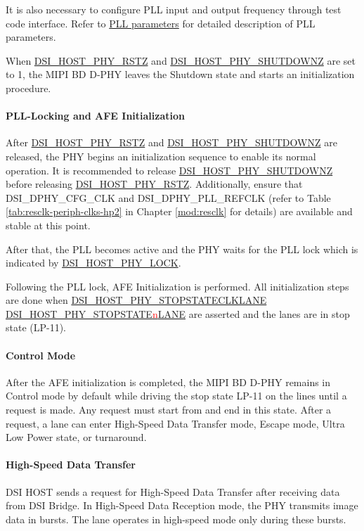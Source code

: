 \documentclass[main\_\_EN.tex]{subfiles}
\begin{document}
It is also necessary to configure PLL input and output frequency through test code interface. Refer to \hyperref[sec:pll-parameters]{PLL parameters} for detailed description of PLL parameters.

When \hyperref[fielddesc:DSIHOSTPHYRSTZ]{DSI\_HOST\_PHY\_RSTZ} and \hyperref[fielddesc:DSIHOSTPHYSHUTDOWNZ]{DSI\_HOST\_PHY\_SHUTDOWNZ} are set to 1, the MIPI BD D-PHY leaves the Shutdown state and starts an initialization procedure.

\paragraph{PLL-Locking and AFE Initialization}
After \hyperref[fielddesc:DSIHOSTPHYRSTZ]{DSI\_HOST\_PHY\_RSTZ} and \hyperref[fielddesc:DSIHOSTPHYSHUTDOWNZ]{DSI\_HOST\_PHY\_SHUTDOWNZ} are released, the PHY begins an initialization sequence to enable its normal operation. It is recommended to release \hyperref[fielddesc:DSIHOSTPHYSHUTDOWNZ]{DSI\_HOST\_PHY\_SHUTDOWNZ} before releasing \hyperref[fielddesc:DSIHOSTPHYRSTZ]{DSI\_HOST\_PHY\_RSTZ}. Additionally, ensure that DSI\_DPHY\_CFG\_CLK and DSI\_DPHY\_PLL\_REFCLK (refer to Table \ref{tab:resclk-periph-clks-hp2} in Chapter \ref{mod:resclk} \textit{} for details) are available and stable at this point.

After that, the PLL becomes active and the PHY waits for the PLL lock which is indicated by \hyperref[fielddesc:DSIHOSTPHYLOCK]{DSI\_HOST\_PHY\_LOCK}.

Following the PLL lock, AFE Initialization is performed. All initialization steps are done when \hyperref[fielddesc:DSIHOSTPHYSTOPSTATECLKLANE]{DSI\_HOST\_PHY\_STOPSTATECLKLANE} \hyperref[fielddesc:DSIHOSTPHYSTOPSTATE0LANE]{DSI\_HOST\_PHY\_STOPSTATE\textcolor{red}{n}LANE} are asserted and the lanes are in stop state (LP-11).

\paragraph{Control Mode}
After the AFE initialization is completed, the MIPI BD D-PHY remains in Control mode by default while driving the stop state LP-11 on the lines until a request is made. Any request must start from and end in this state. After a request, a lane can enter High-Speed Data Transfer mode, Escape mode, Ultra Low Power state, or turnaround.


\paragraph{High-Speed Data Transfer}
DSI HOST sends a request for High-Speed Data Transfer after receiving data from DSI Bridge. In High-Speed Data Reception mode, the PHY transmits image data in bursts. The lane operates in high-speed mode only during these bursts.
\end{document}
